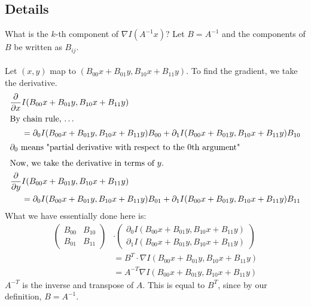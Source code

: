 \documentclass[10pt]{article}
\begin{document}
\subsection*{Details}
What is the $k$-th component of $\nabla I(A^{-1}x)$?  Let $B = A^{-1}$ and the components of $B$ be written as $B_{ij}$.\\\\
Let $(x, y)$ map to $(B_{00} x + B_{01}y, B_{10}x + B_{11}y)$.  To find the gradient, we take the derivative.
\begin{align*}
    \frac{\partial}{\partial x} &I(B_{00}x + B_{01}y, B_{10}x + B_{11}y)\\
    \intertext{By chain rule, \dots}
    &= \partial_0 I(B_{00}x + B_{01}y, B_{10}x + B_{11}y) B_{00} + \partial_1 I(B_{00}x + B_{01}y, B_{10}x + B_{11}y) B_{10}\\
    \intertext{$\partial_0$ means "partial derivative with respect to the 0th argument"}
    \intertext{Now, we take the derivative in terms of $y$.}
    \frac{\partial}{\partial y} &I(B_{00}x + B_{01}y, B_{10}x + B_{11}y)\\
    &= \partial_0 I(B_{00}x + B_{01}y, B_{10}x + B_{11}y) B_{01} + \partial_1 I(B_{00}x + B_{01}y, B_{10}x + B_{11}y) B_{11}
\end{align*} 
What we have essentially done here is:
\begin{align*}
    \begin{pmatrix} B_{00} & B_{10} \\ B_{01} & B_{11} \end{pmatrix} &\cdot \begin{pmatrix}\partial_0 I(B_{00}x + B_{01}y, B_{10}x + B_{11}y) \\ \partial_1 I(B_{00}x + B_{01}y, B_{10}x + B_{11}y)\end{pmatrix}\\
    &= B^T \cdot \nabla I(B_{00}x + B_{01}y, B_{10}x + B_{11}y)\\
    &= A^{-T}\nabla I(B_{00}x + B_{01}y, B_{10}x + B_{11}y)
\end{align*}
$A^{-T}$ is the inverse and transpose of $A$. This is equal to $B^T$, since by our definition, $B = A^{-1}$.
\end{document}
